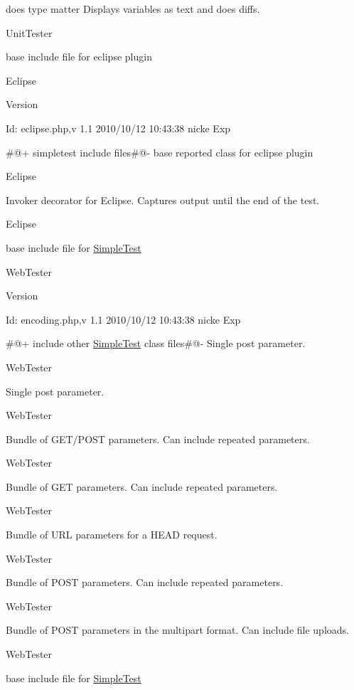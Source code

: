 does type matter Displays variables as text and does diffs.

UnitTester

base include file for eclipse plugin

Eclipse \begin{DoxyVersion}{Version}

\end{DoxyVersion}
\begin{DoxyParagraph}{Id:}
eclipse.php,v 1.1 2010/10/12 10:43:38 nicke Exp 
\end{DoxyParagraph}


\#@+ simpletest include files\#@-\/ base reported class for eclipse plugin

Eclipse

Invoker decorator for Eclipse. Captures output until the end of the test.

Eclipse

base include file for \hyperlink{class_simple_test}{SimpleTest}

WebTester \begin{DoxyVersion}{Version}

\end{DoxyVersion}
\begin{DoxyParagraph}{Id:}
encoding.php,v 1.1 2010/10/12 10:43:38 nicke Exp 
\end{DoxyParagraph}


\#@+ include other \hyperlink{class_simple_test}{SimpleTest} class files\#@-\/ Single post parameter.

WebTester

Single post parameter.

WebTester

Bundle of GET/POST parameters. Can include repeated parameters.

WebTester

Bundle of GET parameters. Can include repeated parameters.

WebTester

Bundle of URL parameters for a HEAD request.

WebTester

Bundle of POST parameters. Can include repeated parameters.

WebTester

Bundle of POST parameters in the multipart format. Can include file uploads.

WebTester

base include file for \hyperlink{class_simple_test}{SimpleTest}

